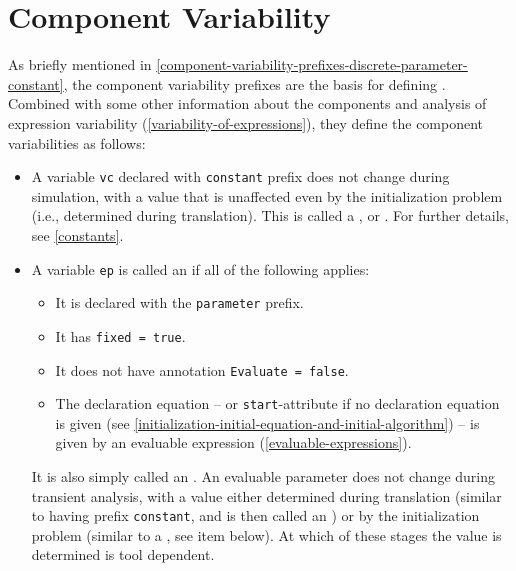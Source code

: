 \section{Component Variability}\label{component-variability}

As briefly mentioned in \cref{component-variability-prefixes-discrete-parameter-constant}, the component variability prefixes are the basis for defining .
Combined with some other information about the components and analysis of expression variability (\cref{variability-of-expressions}), they define the component variabilities as follows:
\begin{itemize}
\item
  A variable \lstinline!vc! declared with \lstinline!constant! prefix does not change during simulation, with a value that is unaffected even by the initialization problem (i.e., determined during translation).
  This is called a , or .
  For further details, see \ref{constants}.
\item
  A variable \lstinline!ep! is called an  if all of the following applies:
  \begin{itemize}
  \item
    It is declared with the \lstinline!parameter! prefix.
  \item
    It has \lstinline!fixed = true!.
  \item
    It does not have annotation \lstinline!Evaluate = false!.
  \item
    The declaration equation -- or \lstinline!start!-attribute if no declaration equation is given (see \cref{initialization-initial-equation-and-initial-algorithm}) -- is given by an evaluable expression (\cref{evaluable-expressions}).
  \end{itemize}
  It is also simply called an .
  An evaluable parameter does not change during transient analysis, with a value either determined during translation (similar to having prefix \lstinline!constant!, and is then called an ) or by the initialization problem (similar to a , see item below).
  At which of these stages the value is determined is tool dependent.

\end{itemize}
